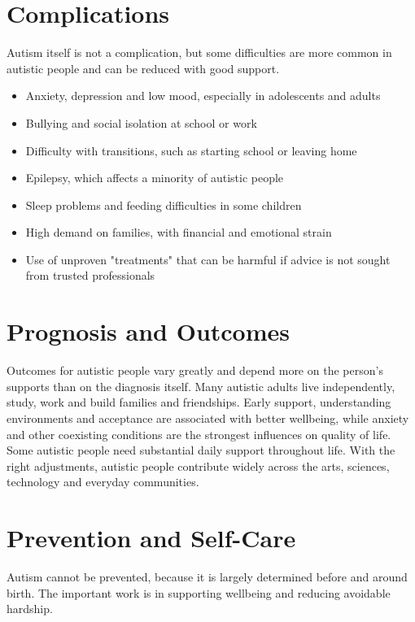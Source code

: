 \section*{Complications}
Autism itself is not a complication, but some difficulties are more common in autistic people and can be reduced with good support.

\begin{itemize}
    \item Anxiety, depression and low mood, especially in adolescents and adults
    \item Bullying and social isolation at school or work
    \item Difficulty with transitions, such as starting school or leaving home
    \item Epilepsy, which affects a minority of autistic people
    \item Sleep problems and feeding difficulties in some children
    \item High demand on families, with financial and emotional strain
    \item Use of unproven "treatments" that can be harmful if advice is not sought from trusted professionals
\end{itemize}

\section*{Prognosis and Outcomes}
Outcomes for autistic people vary greatly and depend more on the person's supports than on the diagnosis itself. Many autistic adults live independently, study, work and build families and friendships. Early support, understanding environments and acceptance are associated with better wellbeing, while anxiety and other coexisting conditions are the strongest influences on quality of life. Some autistic people need substantial daily support throughout life. With the right adjustments, autistic people contribute widely across the arts, sciences, technology and everyday communities.

\section*{Prevention and Self-Care}
Autism cannot be prevented, because it is largely determined before and around birth. The important work is in supporting wellbeing and reducing avoidable hardship.

